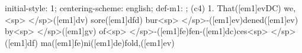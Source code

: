 initial-style: 1;
centering-scheme: english;
def-m1: \grealign;
(c4) 1. That([em1]evDC) we,<sp> </sp>([em1]dv) sore([em1]dfd) bur<sp> </sp>-([em1]ev)dened([em1]ev) by<sp> </sp>([em1]gv) of<sp> </sp>-([em1]fe)fen-([em1]dc)ces<sp> </sp>([em1]df) ma([em1]fe)ni([em1]de)fold,([em1]ev)